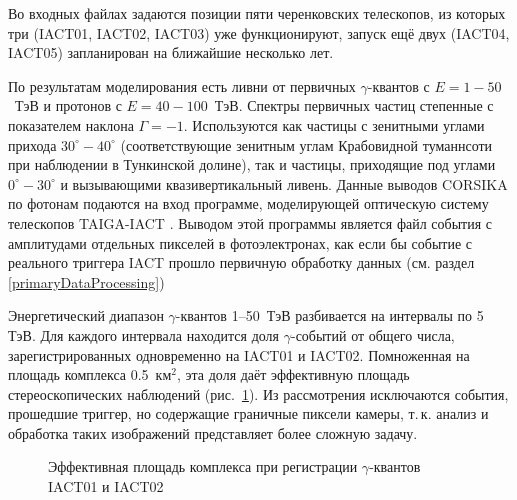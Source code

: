 \documentclass[magd,floatypics,numeref]{msudipl} %
\begin{document}
Во входных файлах задаются позиции пяти черенковских телескопов, из которых три (IACT01, IACT02, IACT03) уже функционируют, запуск ещё двух (IACT04, IACT05) запланирован на ближайшие несколько лет. 

По результатам моделирования  есть ливни от первичных $\gamma$-квантов с $E=1-50$~ТэВ и протонов с $E=40-100$~ТэВ. Спектры первичных частиц степенные с показателем наклона $\Gamma=-1$. Используются как частицы с зенитными углами прихода $30^{\circ}-40^{\circ}$ (соответствующие зенитным углам Крабовидной туманнсоти при наблюдении в Тункинской долине), так и частицы, приходящие под углами $0^{\circ}-30^{\circ}$ и вызывающими квазивертикальный ливень. Данные выводов CORSIKA по фотонам подаются на вход программе, моделирующей оптическую систему телескопов TAIGA-IACT \cite{grinyuk2020monte}. Выводом этой программы является файл события с амплитудами отдельных пикселей в фотоэлектронах, как если бы событие с реального триггера IACT прошло первичную обработку данных (см. раздел \ref{primaryDataProcessing})

Энергетический диапазон $\gamma$-квантов 1--50~ТэВ разбивается на интервалы по 5 ТэВ. Для каждого интервала находится доля $\gamma$-событий от общего числа, зарегистрированных одновременно на IACT01 и IACT02. Помноженная на площадь комплекса 0.5~км$^2$, эта доля даёт эффективную площадь стереоскопических наблюдений (рис.~\ref{pic:EffectiveArea}\afterpage{\clearpage}). Из рассмотрения исключаются события, прошедшие триггер, но содержащие граничные пиксели камеры, т.\,к. анализ и обработка таких изображений представляет более сложную задачу.

\begin{figure}[b]
	\noindent{}
	\caption{Эффективная площадь комплекса при регистрации $\gamma$-квантов IACT01 и IACT02}
	\label{pic:EffectiveArea}
\end{figure}
\end{document}
